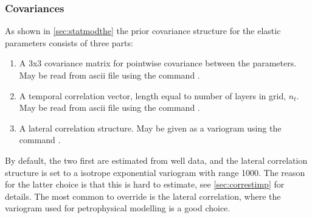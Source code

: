 \subsubsection{Covariances}
\label{sec:basiccorr}
As shown in \autoref{sec:statmodthe} the prior covariance structure for the elastic parameters consists of three parts:
\begin{enumerate}
\item A 3x3 covariance matrix for pointwise covariance between the parameters. May be read from ascii file using the command .
\item A temporal correlation vector, length equal to number of layers in grid, $n_t$. May be read from ascii file using the command .
\item A lateral correlation structure. May be given as a variogram using the command .
\end{enumerate}
By default, the two first are estimated from well data, and the lateral correlation structure is set to a isotrope exponential variogram with range 1000. The reason for the latter choice is that this is hard to estimate, see \autoref{sec:correstimp} for details. The most common to override is the lateral correlation, where the variogram used for petrophysical modelling is a good choice.
